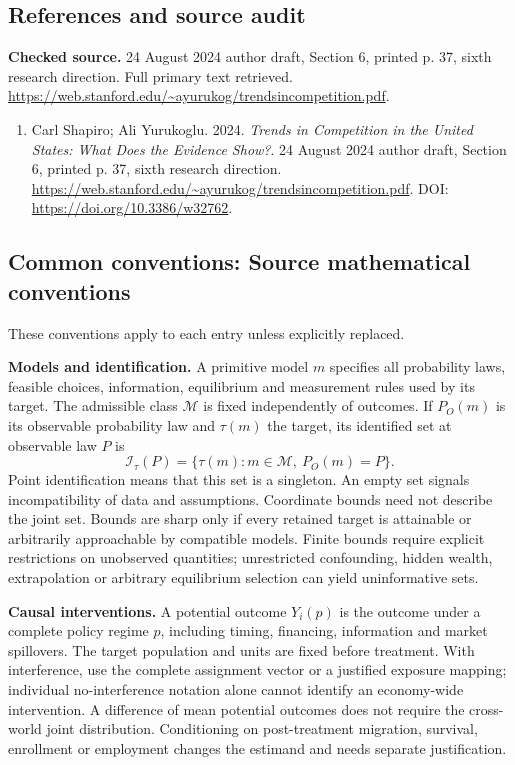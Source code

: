 \documentclass[11pt,a4paper]{article}
\begin{document}
\subsection*{References and source audit}
\textbf{Checked source.} 24 August 2024 author draft, Section 6, printed p. 37, sixth research direction. Full primary text retrieved. \url{https://web.stanford.edu/~ayurukog/trendsincompetition.pdf}.
\begin{enumerate}\raggedright
\item\hypertarget{definitions:source:30007674:1}{} Carl Shapiro; Ali Yurukoglu. 2024. \emph{Trends in Competition in the United States: What Does the Evidence Show?}. 24 August 2024 author draft, Section 6, printed p. 37, sixth research direction.
\url{https://web.stanford.edu/~ayurukog/trendsincompetition.pdf}.
DOI: \url{https://doi.org/10.3386/w32762}.
\end{enumerate}

\subsection*{Common conventions: Source mathematical conventions}

These conventions apply to each entry unless explicitly replaced.

\textbf{Models and identification.} A primitive model \(m\) specifies all probability laws, feasible choices, information, equilibrium and measurement rules used by its target. The admissible class \(\mathcal M\) is fixed independently of outcomes. If \(P_O(m)\) is its observable probability law and \(\tau(m)\) the target, its identified set at observable law \(P\) is
\[
 \mathcal I_\tau(P)=\{\tau(m):m\in\mathcal M,\ P_O(m)=P\}.
\]
Point identification means that this set is a singleton. An empty set signals incompatibility of data and assumptions. Coordinate bounds need not describe the joint set. Bounds are sharp only if every retained target is attainable or arbitrarily approachable by compatible models. Finite bounds require explicit restrictions on unobserved quantities; unrestricted confounding, hidden wealth, extrapolation or arbitrary equilibrium selection can yield uninformative sets.

\textbf{Causal interventions.} A potential outcome \(Y_i(p)\) is the outcome under a complete policy regime \(p\), including timing, financing, information and market spillovers. The target population and units are fixed before treatment. With interference, use the complete assignment vector or a justified exposure mapping; individual no-interference notation alone cannot identify an economy-wide intervention. A difference of mean potential outcomes does not require the cross-world joint distribution. Conditioning on post-treatment migration, survival, enrollment or employment changes the estimand and needs separate justification.
\end{document}
